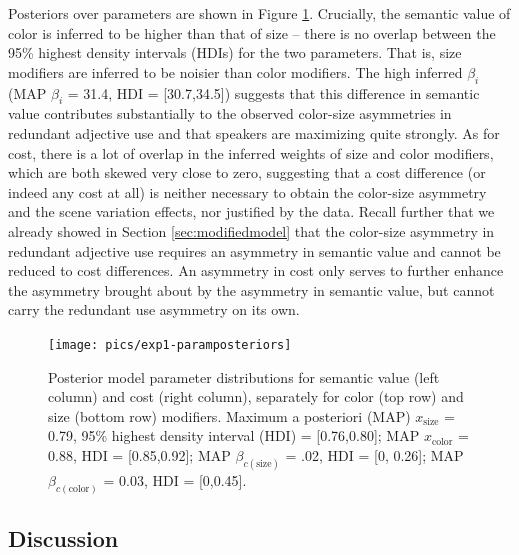 \documentclass[11pt]{article}
\newcommand{\figref}[1]{Figure \ref{#1}}
\newcommand{\sectionref}[1]{Section \ref{#1}}
\begin{document}
Posteriors over parameters are shown in \figref{fig:modifierparamposteriors}. Crucially, the semantic value of color is inferred to be higher than that of size -- there is no overlap between the 95\% highest density intervals (HDIs) for the two parameters. That is, size modifiers are inferred to be noisier than color modifiers. The  high inferred $\beta_i$ (MAP $\beta_i$ = 31.4, HDI = [30.7,34.5]) suggests that this difference in semantic value contributes substantially to the observed color-size asymmetries in redundant adjective use and that speakers are maximizing quite strongly. As for cost, there is a lot of overlap in the inferred weights of size and color modifiers, which are both skewed very close to zero, suggesting that a cost difference (or indeed any cost at all) is neither necessary  to obtain the color-size asymmetry and the scene variation effects, nor justified by the data. Recall further that we already showed in \sectionref{sec:modifiedmodel}  that the color-size asymmetry in redundant adjective use requires an asymmetry in semantic value and cannot be reduced to cost differences. An asymmetry in cost only serves to further enhance the asymmetry brought about by the  asymmetry in semantic value, but cannot carry the redundant use asymmetry on its own.


\begin{figure}
\centering
\texttt{[image: pics/exp1-paramposteriors]}
\caption{Posterior model parameter distributions for semantic value (left column) and cost (right column), separately for color (top row) and size (bottom row) modifiers. Maximum a posteriori (MAP)  $x_{\textrm{size}}$ = 0.79, 95\% highest density interval (HDI) = [0.76,0.80]; MAP $x_{\textrm{color}}$ = 0.88, HDI = [0.85,0.92]; MAP $\beta_{c(\textrm{size})}$ = .02, HDI = [0, 0.26]; MAP $\beta_{c(\textrm{color})}$ = 0.03, HDI = [0,0.45].}
\label{fig:modifierparamposteriors}
\end{figure}

\subsection{Discussion}
\label{sec:modifierdiscussion}
\end{document}
